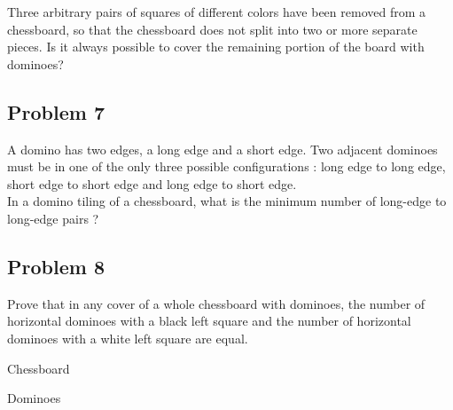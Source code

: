 \documentclass[12pt,a4paper,article,english,firamath]{nsi}
\begin{document}
Three arbitrary pairs of squares of different colors have been removed from a chessboard, so that the chessboard does not split into two or more separate pieces. Is it always possible to cover the remaining portion of the board with
dominoes?

\subsection*{Problem 7}

A domino has two edges, a long edge and a short edge. Two adjacent dominoes must be in one of the only three possible
configurations : long edge to long edge, short edge to short edge and long edge to short edge.\\ In a domino tiling of a
chessboard, what is the minimum number of long-edge to long-edge pairs ?

\subsection*{Problem 8}

Prove that in any cover of a whole chessboard with dominoes, the number of horizontal
dominoes with a black left square and the number of horizontal dominoes with a white left square are equal.

\begin{center}
\titlefont\LARGE\color{UGLiBlue} Chessboard\\[2em]




\newpage
Dominoes\\[2em]

\end{center}
\end{document}
